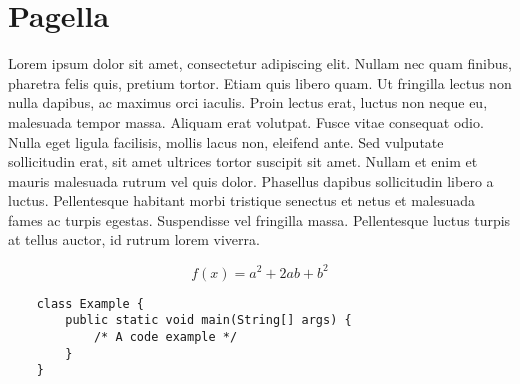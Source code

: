 \documentclass{article}
\begin{document}
\section*{Pagella}
\noindent Lorem ipsum dolor sit amet, consectetur adipiscing elit. Nullam nec
quam finibus, pharetra felis quis, pretium tortor. Etiam quis libero quam. Ut
fringilla lectus non nulla dapibus, ac maximus orci iaculis. Proin lectus erat,
luctus non neque eu, malesuada tempor massa. Aliquam erat volutpat. Fusce vitae
consequat odio. Nulla eget ligula facilisis, mollis lacus non, eleifend ante.
Sed vulputate sollicitudin erat, sit amet ultrices tortor suscipit sit amet.
Nullam et enim et mauris malesuada rutrum vel quis dolor. Phasellus dapibus
sollicitudin libero a luctus. Pellentesque habitant morbi tristique senectus et
netus et malesuada fames ac turpis egestas. Suspendisse vel fringilla massa.
Pellentesque luctus turpis at tellus auctor, id rutrum lorem viverra.

\bigskip

\begin{equation}
    f(x) = a^2 + 2ab + b^2 
\end{equation}

\bigskip

\begin{verbatim}
    class Example {
        public static void main(String[] args) {
            /* A code example */
        }
    }
\end{verbatim}
\end{document}
